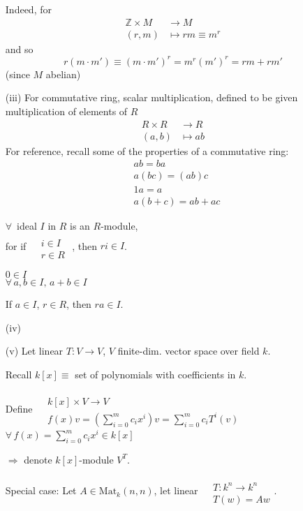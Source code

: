 \documentclass[10pt]{amsart}
\begin{document}
\begin{multicols*}{2}
\begin{enumerate}
	Indeed, for
	\[
	\begin{aligned}
	\mathbb{Z} \times M & \to M \\ 
	(r,m) & \mapsto rm \equiv m^r 
	\end{aligned}
	\]
	and so
	\[
	r(m\cdot m') \equiv (m\cdot m')^r = m^r (m')^r = rm + rm' 
	\]
	(since $M$ abelian)
	\item[(iii)] For commutative ring, scalar multiplication, defined to be given multiplication of elements of $R$
	\[
	\begin{aligned}
	R\times R & \to R \\
	(a,b) & \mapsto ab 
	\end{aligned}
	\]
	For reference, recall some of the properties of a commutative ring:
	\[
	\begin{aligned}
	& ab = ba \\ 
	& a(bc) = (ab)c \\ 
	& 1a = a \\ 
	& a(b+c) = ab + ac
	\end{aligned}
	\]
	
	$\forall \, $ ideal $I$ in $R$ is an $R$-module, \\
	for if $\begin{aligned} & \quad \\
	& i \in I \\
	& r\in R \end{aligned}$ , then $ri \in I$.
	
	$0\in I$ \\
	$\forall \, a,b \in I, \, a+b \in I$
	
	
	If $a\in I$, $r\in R$, then $ra \in I$.
	
	
	\item[(iv)]
	\item[(v)] Let linear $T:V \to V$, $V$ finite-dim. vector space over field $k$.  
	
	Recall $k[x] \equiv $ set of polynomials with coefficients in $k$.  
	
	Define $\begin{aligned} & \quad \\
	& k[x] \times V \to V \\
	& f(x)v =\left(\sum_{i=0}^m c_i x^i\right)v =\sum_{i=0}^m c_iT^i(v) \end{aligned}$ \quad \, $\forall \, f(x) = \sum_{i=0}^m c_ix^i \in k[x]$
	
	$\Longrightarrow $ denote $k[x]$-module $V^T$.  
	
	Special case: Let $A \in \text{Mat}_k(n,n)$, let linear $\begin{aligned} & \quad \\
	& T :k^n \to k^n \\
	& T(w) = Aw \end{aligned}$.  
	

\end{enumerate}
\end{multicols*}
\end{document}
